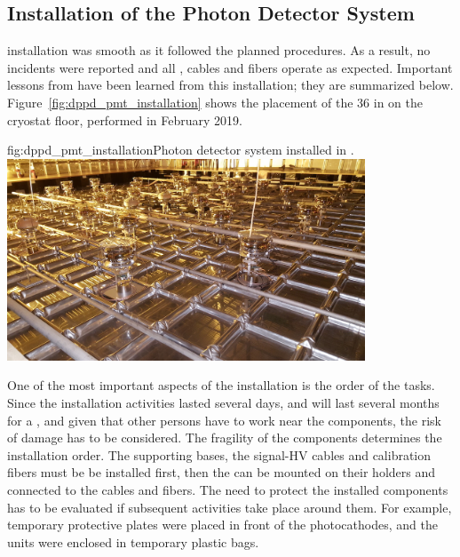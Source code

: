 
\subsection{Installation of the  Photon Detector System}

  installation was smooth as it followed the planned procedures. As a result, no incidents were reported and all , cables and fibers operate as expected. Important lessons from  have been learned from this installation; %
they are summarized below. Figure~\ref{fig:dppd_pmt_installation} shows the placement of the \num{36}  in  on the cryostat floor, performed in February 2019.

\begin{dunefigure}{fig:dppd_pmt_installation}{Photon detector system installed in .}
\includegraphics[width=0.8\textwidth]{graphics/dppd_pmt_installation.jpg}
\end{dunefigure}

One of the most important aspects of the installation is the order of the tasks. Since the   installation activities lasted several days, %
and will last several months for a , and given that other persons have to work near the  components, the risk of damage has to be considered. The fragility of the components determines the installation order. The  supporting bases, the signal-HV  cables and calibration fibers must be be installed first, then the  can be mounted on their holders and connected to the cables and fibers. The need to protect the installed components has to be evaluated if subsequent activities take place around them. For example,  temporary protective plates were placed in front of the   photocathodes, and the  units were enclosed in temporary plastic bags. 


